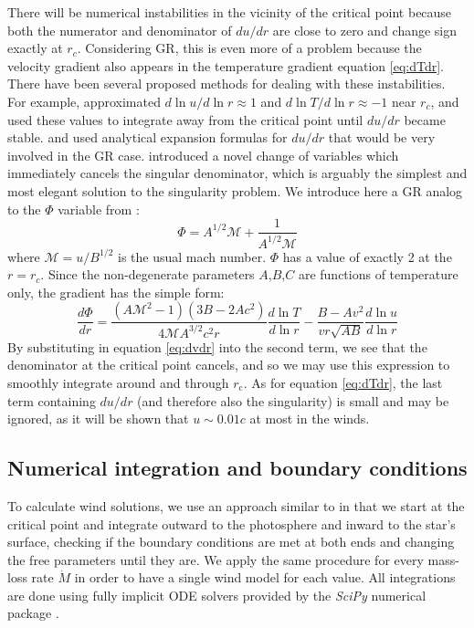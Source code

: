 \documentclass[../main.tex]{subfiles}
\newcommand{\mach}{\mathcal{M}}
\newcommand{\Mdot}{\dot{M}}
\begin{document}
There will be numerical instabilities in the vicinity of the critical point because both the numerator and denominator of $du/dr$ are close to zero and change sign exactly at $r_c$. Considering GR, this is even more of a problem because the velocity gradient also appears in the temperature gradient equation \eqref{eq:dTdr}. There have been several proposed methods for dealing with these instabilities. For example, \citet{Paczynski1986b} approximated $d\ln u/d\ln r\approx 1$ and $d\ln T/d\ln r\approx -1$ near $r_c$, and used these values to integrate away from the critical point until $du/dr$ became stable. \citet{Zytkow1972,Kato1983a} and \citet{Quinn1985} used analytical expansion formulas for $du/dr$ that would be very involved in the GR case. \citet{Joss1987} introduced a novel change of variables which immediately cancels the singular denominator, which is arguably the simplest and most elegant solution to the singularity problem. We introduce here a GR analog to the $\Phi$ variable from \citet{Joss1987}:
\begin{equation}
    \label{eq:phi}
    \Phi=A^{1/2}\mach+\frac{1}{A^{1/2}\mach}
\end{equation}
where $\mach=u/B^{1/2}$ is the usual mach number. $\Phi$ has a value of exactly 2 at the $r=r_c$.  Since the non-degenerate parameters $A$,$B$,$C$ are functions of temperature only, the gradient has the simple form:
\begin{equation}
    \frac{d\Phi}{dr}=\frac{(A\mach^2-1)(3B-2Ac^2)}{4\mach A^{3/2}c^2r}
    \frac{d\ln T}{d\ln r}
    -\frac{B-Av^2}{vr\sqrt{AB}}\frac{d\ln u}{d\ln r}
    \label{eq:dphidr}
\end{equation}
By substituting in equation \eqref{eq:dvdr} into the second term, we see that the denominator at the critical point cancels, and so we may use this expression to smoothly integrate around and through $r_\text{c}$.  As for equation \eqref{eq:dTdr}, the last term containing $du/dr$ (and therefore also the singularity) is small and may be ignored, as it will be shown that $u\sim 0.01c$ at most in the winds.

\subsection{Numerical integration and boundary conditions}\label{sec:wind_numerical_method}
To calculate wind solutions, we use an approach similar to \citet{Paczynski1986b} in that we start at the critical point and integrate outward to the photosphere and inward to the star's surface, checking if the boundary conditions are met at both ends and changing the free parameters until they are. We apply the same procedure for every mass-loss rate $\Mdot$ in order to have a single wind model for each value.  All integrations are done using fully implicit ODE solvers provided by the \textit{SciPy} numerical package \citep{SciPy}.\\
\end{document}
